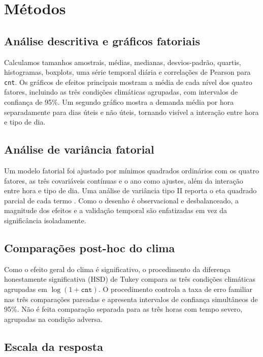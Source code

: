\documentclass[12pt]{article}
\begin{document}
\section{Métodos}

\subsection{Análise descritiva e gráficos fatoriais}

Calculamos tamanhos amostrais, médias, medianas, desvios-padrão, quartis,
histogramas, boxplots, uma série temporal diária e correlações de Pearson para
\texttt{cnt}. Os gráficos de efeitos principais mostram a média de cada nível
dos quatro fatores, incluindo as três condições climáticas agrupadas, com
intervalos de confiança de 95\%. Um segundo gráfico mostra
a demanda média por hora separadamente para dias úteis e não úteis, tornando
visível a interação entre hora e tipo de dia.

\subsection{Análise de variância fatorial}

Um modelo fatorial foi ajustado por mínimos quadrados ordinários com os quatro
fatores, as três covariáveis contínuas e o ano como ajustes, além da interação
entre hora e tipo de dia. Uma análise de variância tipo II reporta o eta
quadrado parcial de cada termo \cite{montgomery2017}. Como o desenho é
observacional e desbalanceado, a magnitude dos efeitos e a validação temporal
são enfatizadas em vez da significância isoladamente.

\subsection{Comparações post-hoc do clima}

Como o efeito geral do clima é significativo, o procedimento da diferença
honestamente significativa (HSD) de Tukey \cite{tukey1949} compara as três
condições climáticas agrupadas em $\log(1+\texttt{cnt})$. O procedimento controla
a taxa de erro familiar nas três comparações pareadas e apresenta intervalos de
confiança simultâneos de 95\%. Não é feita comparação separada para as três
horas com tempo severo, agrupadas na condição adversa.

\subsection{Escala da resposta}
\end{document}
